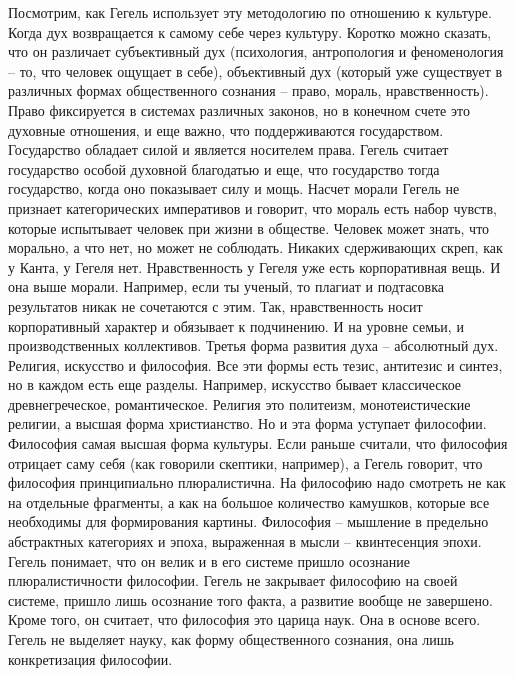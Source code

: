 \documentclass[a4paper, 12pt]{article}
\begin{document}
Посмотрим, как Гегель использует эту методологию по отношению к культуре. Когда дух возвращается к самому себе через культуру. Коротко можно сказать, что он различает субъективный дух (психология, антропология и феноменология -- то, что человек ощущает в себе), объективный дух (который уже существует в различных формах общественного сознания -- право, мораль, нравственность). Право фиксируется в системах различных законов, но в конечном счете это духовные отношения, и еще важно, что поддерживаются государством. Государство обладает силой и является носителем права. Гегель считает государство особой духовной благодатью и еще, что государство тогда государство, когда оно показывает силу и мощь. Насчет морали Гегель не признает категорических императивов и говорит, что мораль есть набор чувств, которые испытывает человек при жизни в обществе. Человек может знать, что морально, а что нет, но может не соблюдать. Никаких сдерживающих скреп, как у Канта, у Гегеля нет. Нравственность у Гегеля уже есть корпоративная вещь. И она выше морали. Например, если ты ученый, то плагиат и подтасовка результатов никак не сочетаются с этим. Так, нравственность носит корпоративный характер и обязывает к подчинению. И на уровне семьи, и производственных коллективов. Третья форма развития духа -- абсолютный дух. Религия, искусство и философия. Все эти формы есть тезис, антитезис и синтез, но в каждом есть еще разделы. Например, искусство бывает классическое древнегреческое, романтическое. Религия это политеизм, монотеистические религии, а высшая форма христианство. Но и эта форма уступает философии. Философия самая высшая форма культуры. Если раньше считали, что философия отрицает саму себя (как говорили скептики, например), а Гегель говорит, что философия принципиально плюралистична. На философию надо смотреть не как на отдельные фрагменты, а как на большое количество камушков, которые все необходимы для формирования картины. Философия -- мышление в предельно абстрактных категориях и эпоха, выраженная в мысли -- квинтесенция эпохи. Гегель понимает, что он велик и в его системе пришло осознание плюралистичности философии. Гегель не закрывает философию на своей системе, пришло лишь осознание того факта, а развитие вообще не завершено. Кроме того, он считает, что философия это царица наук. Она в основе всего. Гегель не выделяет науку, как форму общественного сознания, она лишь конкретизация философии. 
\end{document}

